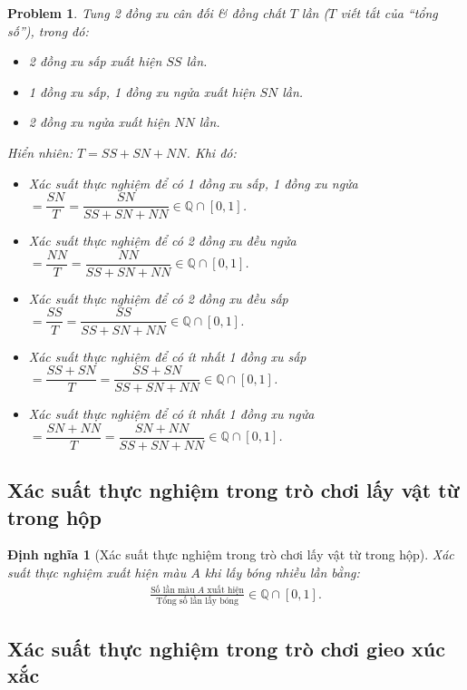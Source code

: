 \documentclass[oneside]{book}
\numberwithin{equation}{section}
\newtheorem{dinhnghia}{Định nghĩa}[section]
\newtheorem{problem}{Problem}[section]
\begin{document}
\begin{problem}
	Tung 2 đồng xu cân đối \textit{\&} đồng chất $T$ lần ($T$ viết tắt của ``tổng số''), trong đó:
	\begin{itemize}
		\item 2 đồng xu sấp xuất hiện $SS$ lần.
		\item 1 đồng xu sấp, 1 đồng xu ngửa xuất hiện $SN$ lần.
		\item 2 đồng xu ngửa xuất hiện $NN$ lần.
	\end{itemize}
	Hiển nhiên: $T = SS + SN + NN$. Khi đó:
	\begin{itemize}
		\item Xác suất thực nghiệm để có 1 đồng xu sấp, 1 đồng xu ngửa $= \dfrac{SN}{T} = \dfrac{SN}{SS + SN + NN}\in\mathbb{Q}\cap[0,1]$.
		\item Xác suất thực nghiệm để có 2 đồng xu đều ngửa $= \dfrac{NN}{T} = \dfrac{NN}{SS + SN + NN}\in\mathbb{Q}\cap[0,1]$.
		\item Xác suất thực nghiệm để có 2 đồng xu đều sấp $= \dfrac{SS}{T} = \dfrac{SS}{SS + SN + NN}\in\mathbb{Q}\cap[0,1]$.
		\item Xác suất thực nghiệm để có ít nhất 1 đồng xu sấp $= \dfrac{SS + SN}{T} = \dfrac{SS + SN}{SS + SN + NN}\in\mathbb{Q}\cap[0,1]$.
		\item Xác suất thực nghiệm để có ít nhất 1 đồng xu ngửa $= \dfrac{SN + NN}{T} = \dfrac{SN + NN}{SS + SN + NN}\in\mathbb{Q}\cap[0,1]$.
	\end{itemize}
\end{problem}

\subsection{Xác suất thực nghiệm trong trò chơi lấy vật từ trong hộp}

\begin{dinhnghia}[Xác suất thực nghiệm trong trò chơi lấy vật từ trong hộp]
	\emph{Xác suất thực nghiệm xuất hiện màu $A$} khi lấy bóng nhiều lần bằng:
	\begin{align*}
		\frac{\mbox{Số lần màu $A$ xuất hiện}}{\mbox{Tổng số lần lấy bóng}}\in\mathbb{Q}\cap[0,1].
	\end{align*}
\end{dinhnghia}

\subsection{Xác suất thực nghiệm trong trò chơi gieo xúc xắc}
\end{document}
